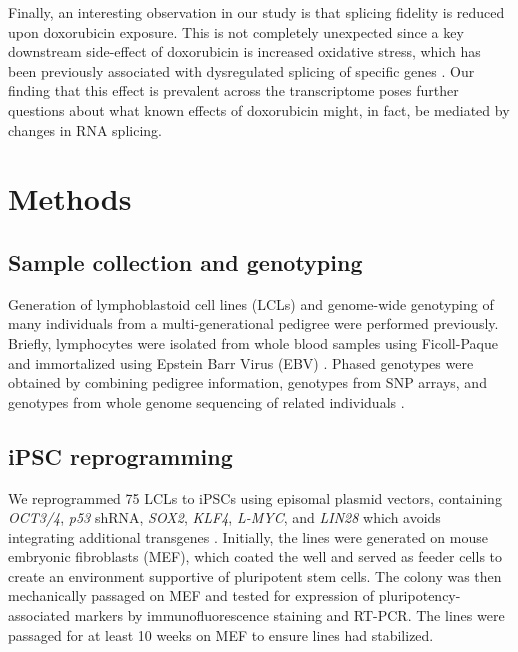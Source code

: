 \documentclass[9pt,lineno]{elife}
\begin{document}
Finally, an interesting observation in our study is that splicing fidelity is reduced upon doxorubicin exposure. This is not completely unexpected since a key downstream side-effect of doxorubicin is increased oxidative stress, which has been previously associated with dysregulated splicing of specific genes \citep{Disher2007,Seo2016}. Our finding that this effect is prevalent across the transcriptome poses further questions about what known effects of  doxorubicin might, in fact, be mediated by changes in RNA splicing. 


\section*{Methods} 

\subsection*{Sample collection and genotyping}

Generation of lymphoblastoid cell lines (LCLs) and genome-wide genotyping of
many individuals from a multi-generational pedigree were performed
previously. Briefly, lymphocytes were isolated from whole blood samples using Ficoll-Paque and immortalized using Epstein Barr Virus (EBV) \citep{Cusanovich2012,
Cusanovich2016}. Phased genotypes were obtained by combining pedigree
information, genotypes from SNP arrays, and genotypes from whole genome
sequencing of related individuals \citep{Livne2015}.

\subsection*{iPSC reprogramming} 

We reprogrammed 75 LCLs to iPSCs using episomal plasmid vectors, containing \emph{OCT3/4}, \emph{p53} shRNA, \emph{SOX2}, \emph{KLF4}, \emph{L-MYC}, and \emph{LIN28} which avoids integrating additional transgenes \citep{Okita2011}. 
Initially, the lines were generated on mouse embryonic fibroblasts (MEF), which coated the well and served as feeder cells to create an environment supportive of pluripotent stem cells.  
The colony was then mechanically passaged on MEF and tested for expression of pluripotency-associated markers by immunofluorescence staining and RT-PCR. 
The lines were passaged for at least 10 weeks on MEF to ensure lines had stabilized. 
\end{document}
